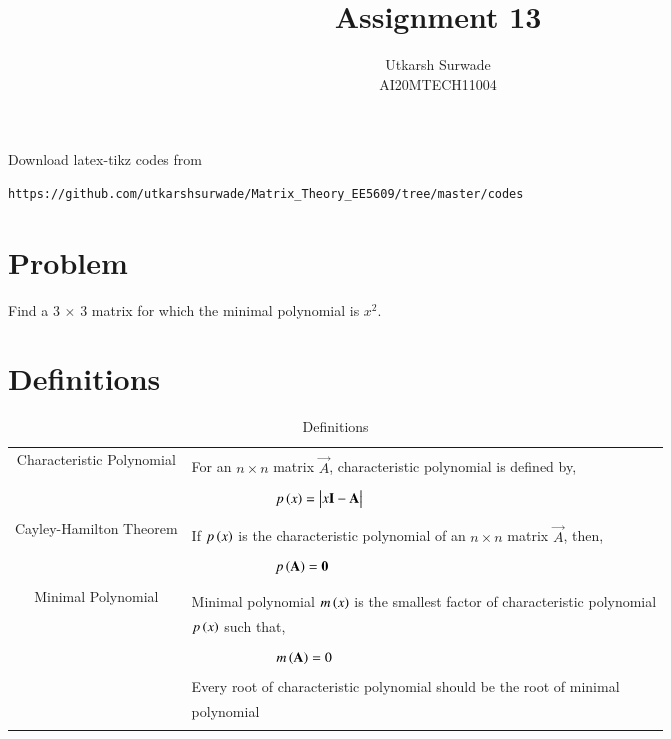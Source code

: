 \documentclass[journal,12pt]{IEEEtran}
\begin{document}
     \def\rightbox#1{\makebox[0in][r]{#1}}
     \def\centbox#1{\makebox[0in]{#1}}
     \def\topbox#1{\raisebox{-\baselineskip}[0in][0in]{#1}}
     \def\midbox#1{\raisebox{-0.5\baselineskip}[0in][0in]{#1}}
\vspace{3cm}
\title{Assignment 13}
\author{Utkarsh Surwade\\AI20MTECH11004}
\maketitle
\bigskip
\renewcommand{\thefigure}{\theenumi}
\renewcommand{\thetable}{\theenumi}
Download latex-tikz codes from 
%
\begin{lstlisting}
https://github.com/utkarshsurwade/Matrix_Theory_EE5609/tree/master/codes
\end{lstlisting}
%
 
\section{\textbf{Problem}}
Find a 3 $\times$ 3 matrix for which the minimal polynomial is $x^2$.

\section{\textbf{Definitions}}
\renewcommand{\thetable}{1}
\begin{table}[ht!]
\centering
\begin{tabular}{|c|l|}
    \hline
	\multirow{3}{*}{Characteristic Polynomial} 
	& \\
	& For an $n\times n$ matrix $\vec{A}$, characteristic polynomial is defined by,\\
	&\\
	& $\qquad\qquad\qquad p\brak{x}=\mydet{x\Vec{I}-\Vec{A}}$\\
	&\\
	\hline
	\multirow{3}{*}{Cayley-Hamilton Theorem}
    &\\
    & If $p\left(x\right)$ is the characteristic polynomial of an $n\times n$ matrix $\vec{A}$, then,\\
    &\\
    &$\qquad \qquad \qquad p\left(\mathbf{A}\right)=\mathbf{0}$\\
    &\\
    \hline
	\multirow{3}{*}{Minimal Polynomial} 
	&\\
	& Minimal polynomial $m\left(x\right)$ is the smallest factor of characteristic polynomial\\
	& $p\left(x\right)$ such that,\\
	&\\
	& $\qquad \qquad \qquad m\left(\mathbf{A}\right)=0$\\
	& \\
	& Every root of characteristic polynomial should be the root of minimal\\
	& polynomial\\
	&\\
    \hline
\end{tabular}
\label{table:1}
    \caption{Definitions}
\end{table}
\newpage
\end{document}
